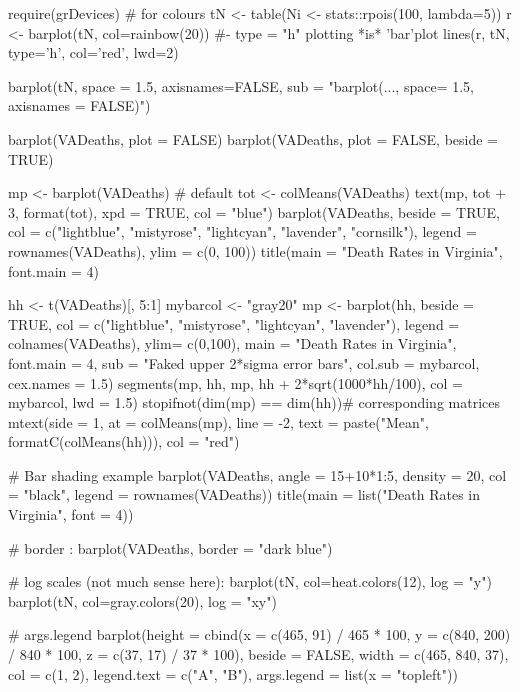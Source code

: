 %
\begin{Examples}
\begin{ExampleCode}
require(grDevices) # for colours
tN <- table(Ni <- stats::rpois(100, lambda=5))
r <- barplot(tN, col=rainbow(20))
#- type = "h" plotting *is* 'bar'plot
lines(r, tN, type='h', col='red', lwd=2)

barplot(tN, space = 1.5, axisnames=FALSE,
        sub = "barplot(..., space= 1.5, axisnames = FALSE)")

barplot(VADeaths, plot = FALSE)
barplot(VADeaths, plot = FALSE, beside = TRUE)

mp <- barplot(VADeaths) # default
tot <- colMeans(VADeaths)
text(mp, tot + 3, format(tot), xpd = TRUE, col = "blue")
barplot(VADeaths, beside = TRUE,
        col = c("lightblue", "mistyrose", "lightcyan",
                "lavender", "cornsilk"),
        legend = rownames(VADeaths), ylim = c(0, 100))
title(main = "Death Rates in Virginia", font.main = 4)

hh <- t(VADeaths)[, 5:1]
mybarcol <- "gray20"
mp <- barplot(hh, beside = TRUE,
        col = c("lightblue", "mistyrose",
                "lightcyan", "lavender"),
        legend = colnames(VADeaths), ylim= c(0,100),
        main = "Death Rates in Virginia", font.main = 4,
        sub = "Faked upper 2*sigma error bars", col.sub = mybarcol,
        cex.names = 1.5)
segments(mp, hh, mp, hh + 2*sqrt(1000*hh/100), col = mybarcol, lwd = 1.5)
stopifnot(dim(mp) == dim(hh))# corresponding matrices
mtext(side = 1, at = colMeans(mp), line = -2,
      text = paste("Mean", formatC(colMeans(hh))), col = "red")

# Bar shading example
barplot(VADeaths, angle = 15+10*1:5, density = 20, col = "black",
        legend = rownames(VADeaths))
title(main = list("Death Rates in Virginia", font = 4))

# border :
barplot(VADeaths, border = "dark blue") 


# log scales (not much sense here):
barplot(tN, col=heat.colors(12), log = "y")
barplot(tN, col=gray.colors(20), log = "xy")

# args.legend
barplot(height = cbind(x = c(465, 91) / 465 * 100,
                       y = c(840, 200) / 840 * 100,
                       z = c(37, 17) / 37 * 100),
        beside = FALSE,
        width = c(465, 840, 37),
        col = c(1, 2),
        legend.text = c("A", "B"),
        args.legend = list(x = "topleft"))
\end{ExampleCode}
\end{Examples}
